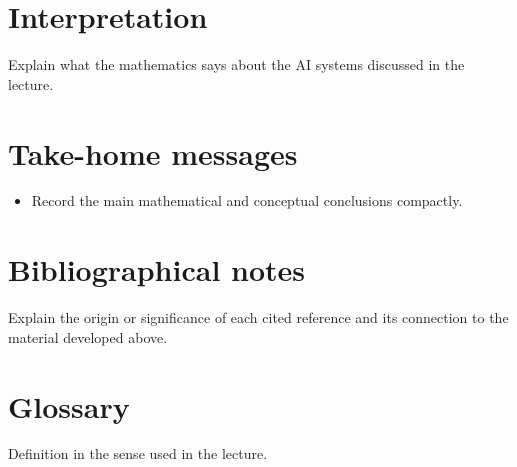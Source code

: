 \documentclass[11pt,twoside]{article}
\theoremstyle{definition}
\theoremstyle{remark}
\begin{document}
\section{Interpretation}

Explain what the mathematics says about the AI systems discussed in the
lecture.


\section{Take-home messages}
\label{sec:take-home}

\begin{itemize}[leftmargin=*]
\item Record the main mathematical and conceptual conclusions compactly.
\end{itemize}

\clearpage
\printendnotes

\section*{Bibliographical notes}

Explain the origin or significance of each cited reference and its connection
to the material developed above.

\section*{Glossary}


\begin{description}[style=nextline,leftmargin=1.5em,labelindent=0pt]
\item[Term]
Definition in the sense used in the lecture.
\end{description}
\end{document}
